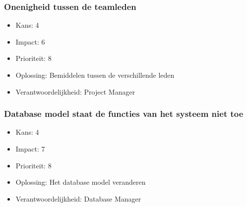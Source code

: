 \subsubsection{Onenigheid tussen de teamleden}
\begin{itemize}
\item Kans: 4
\item Impact: 6
\item Prioriteit: 8
\item Oplossing: Bemiddelen tussen de verschillende leden 
\item Verantwoordelijkheid: Project Manager
\end{itemize}

\subsubsection{Database model staat de functies van het systeem niet toe}
\begin{itemize}
\item Kans: 4
\item Impact: 7
\item Prioriteit: 8
\item Oplossing: Het database model veranderen
\item Verantwoordelijkheid: Database Manager
\end{itemize}
